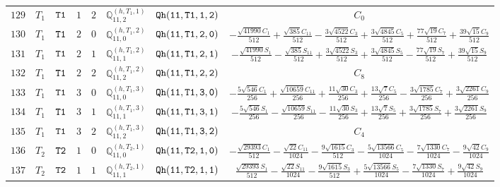\documentclass[fleqn,8pt]{jsarticle}
\begin{document}
\begin{table}[ht!]
\begin{center}
\begin{tabular}{cccccccc}
$ 129 $ & $ T_{1} $ & $ {\tt T1} $ & $ 1 $ & $ 2 $ & $ \mathbb{Q}_{11,2}^{(h,T_{1},1)} $ & $ {\tt Qh(11,T1,1,2)} $ & $ C_{0} $ \\
$ 130 $ & $ T_{1} $ & $ {\tt T1} $ & $ 2 $ & $ 0 $ & $ \mathbb{Q}_{11,0}^{(h,T_{1},2)} $ & $ {\tt Qh(11,T1,2,0)} $ & $ - \frac{\sqrt{41990} C_{1}}{512} + \frac{\sqrt{385} C_{11}}{512} - \frac{3 \sqrt{4522} C_{3}}{512} + \frac{3 \sqrt{4845} C_{5}}{512} + \frac{77 \sqrt{19} C_{7}}{512} + \frac{39 \sqrt{15} C_{9}}{512} $ \\
$ 131 $ & $ T_{1} $ & $ {\tt T1} $ & $ 2 $ & $ 1 $ & $ \mathbb{Q}_{11,1}^{(h,T_{1},2)} $ & $ {\tt Qh(11,T1,2,1)} $ & $ - \frac{\sqrt{41990} S_{1}}{512} - \frac{\sqrt{385} S_{11}}{512} + \frac{3 \sqrt{4522} S_{3}}{512} + \frac{3 \sqrt{4845} S_{5}}{512} - \frac{77 \sqrt{19} S_{7}}{512} + \frac{39 \sqrt{15} S_{9}}{512} $ \\
$ 132 $ & $ T_{1} $ & $ {\tt T1} $ & $ 2 $ & $ 2 $ & $ \mathbb{Q}_{11,2}^{(h,T_{1},2)} $ & $ {\tt Qh(11,T1,2,2)} $ & $ C_{8} $ \\
$ 133 $ & $ T_{1} $ & $ {\tt T1} $ & $ 3 $ & $ 0 $ & $ \mathbb{Q}_{11,0}^{(h,T_{1},3)} $ & $ {\tt Qh(11,T1,3,0)} $ & $ - \frac{5 \sqrt{546} C_{1}}{256} + \frac{\sqrt{10659} C_{11}}{256} + \frac{11 \sqrt{30} C_{3}}{256} + \frac{13 \sqrt{7} C_{5}}{256} - \frac{3 \sqrt{1785} C_{7}}{256} + \frac{3 \sqrt{2261} C_{9}}{256} $ \\
$ 134 $ & $ T_{1} $ & $ {\tt T1} $ & $ 3 $ & $ 1 $ & $ \mathbb{Q}_{11,1}^{(h,T_{1},3)} $ & $ {\tt Qh(11,T1,3,1)} $ & $ - \frac{5 \sqrt{546} S_{1}}{256} - \frac{\sqrt{10659} S_{11}}{256} - \frac{11 \sqrt{30} S_{3}}{256} + \frac{13 \sqrt{7} S_{5}}{256} + \frac{3 \sqrt{1785} S_{7}}{256} + \frac{3 \sqrt{2261} S_{9}}{256} $ \\
$ 135 $ & $ T_{1} $ & $ {\tt T1} $ & $ 3 $ & $ 2 $ & $ \mathbb{Q}_{11,2}^{(h,T_{1},3)} $ & $ {\tt Qh(11,T1,3,2)} $ & $ C_{4} $ \\
$ 136 $ & $ T_{2} $ & $ {\tt T2} $ & $ 1 $ & $ 0 $ & $ \mathbb{Q}_{11,0}^{(h,T_{2},1)} $ & $ {\tt Qh(11,T2,1,0)} $ & $ - \frac{\sqrt{29393} C_{1}}{512} - \frac{\sqrt{22} C_{11}}{1024} - \frac{9 \sqrt{1615} C_{3}}{512} - \frac{5 \sqrt{13566} C_{5}}{1024} - \frac{7 \sqrt{1330} C_{7}}{1024} - \frac{9 \sqrt{42} C_{9}}{1024} $ \\
$ 137 $ & $ T_{2} $ & $ {\tt T2} $ & $ 1 $ & $ 1 $ & $ \mathbb{Q}_{11,1}^{(h,T_{2},1)} $ & $ {\tt Qh(11,T2,1,1)} $ & $ \frac{\sqrt{29393} S_{1}}{512} - \frac{\sqrt{22} S_{11}}{1024} - \frac{9 \sqrt{1615} S_{3}}{512} + \frac{5 \sqrt{13566} S_{5}}{1024} - \frac{7 \sqrt{1330} S_{7}}{1024} + \frac{9 \sqrt{42} S_{9}}{1024} $ \\

\end{tabular}
\end{center}
\end{table}
\end{document}

